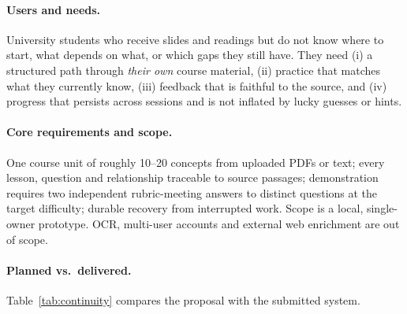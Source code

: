 \documentclass{article}
\begin{document}
\paragraph{Users and needs.} University students who receive slides and readings but do not know where to start, what depends on what, or which gaps they still have. They need (i) a structured path through \emph{their own} course material, (ii) practice that matches what they currently know, (iii) feedback that is faithful to the source, and (iv) progress that persists across sessions and is not inflated by lucky guesses or hints.

\paragraph{Core requirements and scope.} One course unit of roughly 10--20 concepts from uploaded PDFs or text; every lesson, question and relationship traceable to source passages; demonstration requires two independent rubric-meeting answers to distinct questions at the target difficulty; durable recovery from interrupted work. Scope is a local, single-owner prototype. OCR, multi-user accounts and external web enrichment are out of scope.

\paragraph{Planned vs.\ delivered.} Table~\ref{tab:continuity} compares the proposal with the submitted system.
\end{document}
